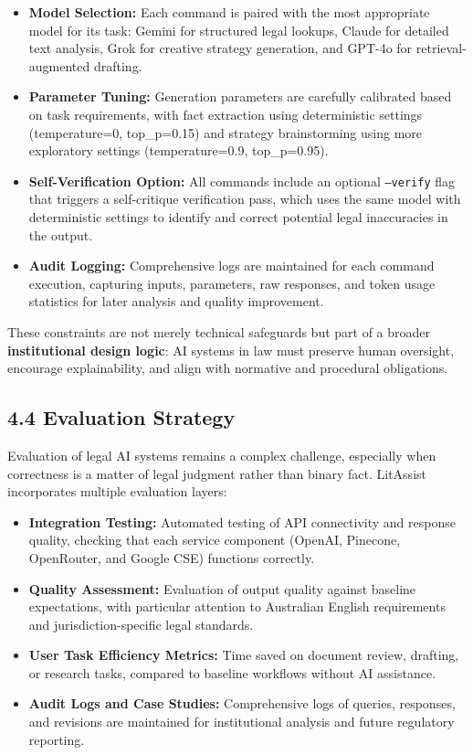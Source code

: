\documentclass[12pt,a4paper]{article}
\begin{document}
\begin{itemize}
\item \textbf{Model Selection:} Each command is paired with the most appropriate model for its task: Gemini for structured legal lookups, Claude for detailed text analysis, Grok for creative strategy generation, and GPT-4o for retrieval-augmented drafting.

\item \textbf{Parameter Tuning:} Generation parameters are carefully calibrated based on task requirements, with fact extraction using deterministic settings (temperature=0, top\_p=0.15) and strategy brainstorming using more exploratory settings (temperature=0.9, top\_p=0.95).

\item \textbf{Self-Verification Option:} All commands include an optional \texttt{--verify} flag that triggers a self-critique verification pass, which uses the same model with deterministic settings to identify and correct potential legal inaccuracies in the output.

\item \textbf{Audit Logging:} Comprehensive logs are maintained for each command execution, capturing inputs, parameters, raw responses, and token usage statistics for later analysis and quality improvement.
\end{itemize}

These constraints are not merely technical safeguards but part of a broader \textbf{institutional design logic}: AI systems in law must preserve human oversight, encourage explainability, and align with normative and procedural obligations.

\subsection*{4.4 Evaluation Strategy}

Evaluation of legal AI systems remains a complex challenge, especially when correctness is a matter of legal judgment rather than binary fact. LitAssist incorporates multiple evaluation layers:

\begin{itemize}
\item \textbf{Integration Testing:} Automated testing of API connectivity and response quality, checking that each service component (OpenAI, Pinecone, OpenRouter, and Google CSE) functions correctly.

\item \textbf{Quality Assessment:} Evaluation of output quality against baseline expectations, with particular attention to Australian English requirements and jurisdiction-specific legal standards.

\item \textbf{User Task Efficiency Metrics:} Time saved on document review, drafting, or research tasks, compared to baseline workflows without AI assistance.

\item \textbf{Audit Logs and Case Studies:} Comprehensive logs of queries, responses, and revisions are maintained for institutional analysis and future regulatory reporting.
\end{itemize}
\end{document}
